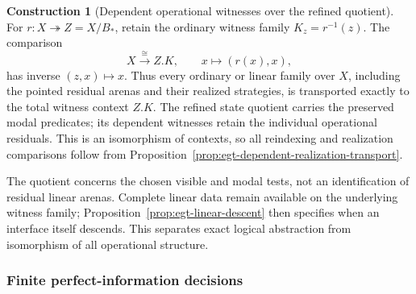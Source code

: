 \documentclass[11pt,a4paper]{article}
\numberwithin{equation}{section}
\theoremstyle{definition}
\newtheorem{construction}[construction]{Construction}
\theoremstyle{remark}
\theoremstyle{plain}
\begin{document}
\begin{construction}[Dependent operational witnesses over the refined quotient]
\label{con:egt-refined-history-witnesses}
For $r:X\twoheadrightarrow Z=X/B_*$, retain the ordinary witness
family $K_z=r^{-1}(z)$. The comparison
\[
 X\xrightarrow{\cong}Z.K,\qquad x\longmapsto(r(x),x),
\]
has inverse $(z,x)\mapsto x$. Thus every ordinary or linear family over
$X$, including the pointed residual arenas and their realized strategies,
is transported exactly to the total witness context $Z.K$.
The refined state quotient carries the preserved modal predicates; its
dependent witnesses retain the individual operational residuals.
This is an isomorphism of contexts, so all reindexing and realization
comparisons follow from
Proposition~\ref{prop:egt-dependent-realization-transport}.
\end{construction}

The quotient concerns the chosen visible and modal tests, not an
identification of residual linear arenas. Complete linear data remain
available on the underlying witness family; Proposition~\ref{prop:egt-linear-descent}
then specifies when an interface itself descends. This separates exact
logical abstraction from isomorphism of all operational structure.

\subsubsection{Finite perfect-information decisions}
\end{document}
